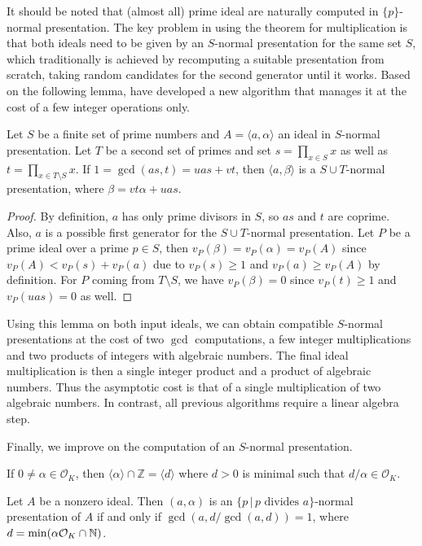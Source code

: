 \documentclass{sig-alternate-05-2015}
\begin{document}
It should be noted that (almost all) prime ideal are naturally computed
in $\{p\}$-normal presentation. The key problem in using the theorem for
multiplication is that both ideals need to be given by an $S$-normal presentation for
the same set $S$, which traditionally is achieved by recomputing
a suitable presentation from scratch, taking random candidates for the
second generator until it works. Based on the following lemma, have developed a new algorithm that manages it at the cost 
of a few integer operations only.

\begin{lemma}
Let $S$ be a finite set of prime numbers and $A=\langle a, \alpha\rangle$ an ideal in
$S$-normal presentation. Let $T$ be a second set of primes and set
$s = \prod_{x\in S} x$ as well as $t = \prod_{x\in T\setminus S} x$. If $1 = \gcd(as, t) = uas + vt$,
then $\langle a, \beta \rangle$ is a $S\cup T$-normal presentation, where $\beta = vt\alpha + uas$.
\end{lemma}

\begin{proof}
By definition, $a$ has only prime divisors in $S$, so $as$ and $t$ are coprime.
Also, $a$ is a possible first generator for the $S\cup T$-normal presentation.
Let $P$ be a prime ideal over a prime $p\in S$, then
$v_P(\beta) = v_P(\alpha)= v_P(A)$ since $v_P(A) <v_P(s)+v_P(a)$ due to $v_P(s)\ge 1$ and $v_P(a) \ge v_P(A)$ by definition.
For $P$ coming from $T\setminus S$, we have $v_P(\beta) = 0$ since $v_P(t)\ge 1$ and $v_P(uas) = 0$ as well.
\end{proof}

Using this lemma on both input ideals, we can obtain compatible $S$-normal 
presentations at the cost of two $\gcd$ computations, a few integer multiplications and two products of integers with algebraic numbers. The final ideal
multiplication is then a single integer product and a product of
algebraic numbers. Thus the asymptotic cost is that of a single multiplication of two algebraic numbers.
In contrast, all previous algorithms require a linear algebra step.

Finally, we improve on the computation of an $S$-normal presentation.

\begin{lemma}
If $0\ne\alpha\in \mathcal O_K$, then $\langle\alpha\rangle\cap \mathbb Z = \langle d\rangle$ where $d>0$ is minimal such that $d/\alpha\in \mathcal O_K$.
\end{lemma}

\begin{theorem}
Let $A$ be a nonzero ideal. Then
$(a, \alpha)$ is an $\{p \, | \, p \text{ divides }a\}$-normal presentation of $A$ if and only if
$\gcd(a, {d}/{\gcd(a, d)}) = 1$, where $d = \min(\alpha\mathcal O_K \cap \mathbb{N})$.
\end{theorem}
\end{document}
